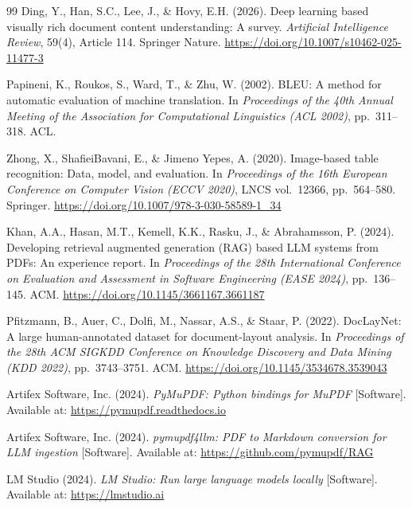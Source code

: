 \documentclass[12pt]{article}
\begin{document}
\begin{thebibliography}{99}
Ding, Y., Han, S.C., Lee, J., \& Hovy, E.H. (2026).
Deep learning based visually rich document content understanding: A survey.
\textit{Artificial Intelligence Review}, 59(4), Article 114.
Springer Nature.
\url{https://doi.org/10.1007/s10462-025-11477-3}


Papineni, K., Roukos, S., Ward, T., \& Zhu, W. (2002).
BLEU: A method for automatic evaluation of machine translation.
In \textit{Proceedings of the 40th Annual Meeting of the Association for
Computational Linguistics (ACL 2002)}, pp.\ 311--318. ACL.

Zhong, X., ShafieiBavani, E., \& Jimeno Yepes, A. (2020).
Image-based table recognition: Data, model, and evaluation.
In \textit{Proceedings of the 16th European Conference on Computer Vision
(ECCV 2020)}, LNCS vol.\ 12366, pp.\ 564--580. Springer.
\url{https://doi.org/10.1007/978-3-030-58589-1_34}


Khan, A.A., Hasan, M.T., Kemell, K.K., Rasku, J., \& Abrahamsson, P. (2024).
Developing retrieval augmented generation (RAG) based LLM systems from PDFs:
An experience report.
In \textit{Proceedings of the 28th International Conference on Evaluation and
Assessment in Software Engineering (EASE 2024)}, pp.\ 136--145. ACM.
\url{https://doi.org/10.1145/3661167.3661187}

Pfitzmann, B., Auer, C., Dolfi, M., Nassar, A.S., \& Staar, P. (2022).
DocLayNet: A large human-annotated dataset for document-layout analysis.
In \textit{Proceedings of the 28th ACM SIGKDD Conference on Knowledge
Discovery and Data Mining (KDD 2022)}, pp.\ 3743--3751. ACM.
\url{https://doi.org/10.1145/3534678.3539043}


Artifex Software, Inc. (2024).
\textit{PyMuPDF: Python bindings for MuPDF} [Software].
Available at: \url{https://pymupdf.readthedocs.io}

Artifex Software, Inc. (2024).
\textit{pymupdf4llm: PDF to Markdown conversion for LLM ingestion} [Software].
Available at: \url{https://github.com/pymupdf/RAG}

LM Studio (2024).
\textit{LM Studio: Run large language models locally} [Software].
Available at: \url{https://lmstudio.ai}

\end{thebibliography}
\end{document}
